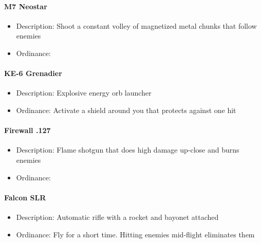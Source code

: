 \documentclass[../Main.tex]{subfiles}
\begin{document}
\paragraph{M7 Neostar}

\begin{itemize}
	\item Description: Shoot a constant volley of magnetized metal chunks that follow enemies
	\item Ordinance:
\end{itemize} 


\paragraph{KE-6 Grenadier}
 
\begin{itemize}
	\item Description: Explosive energy orb launcher
	\item Ordinance: Activate a shield around you that protects against one hit
\end{itemize} 

\paragraph{Firewall .127}

\begin{itemize}
	\item Description: Flame shotgun that does high damage up-close and burns enemies
	\item Ordinance: 
\end{itemize} 

\paragraph{Falcon SLR}

\begin{itemize}
	\item Description: Automatic rifle with a rocket and bayonet attached
	\item Ordinance: Fly for a short time. Hitting enemies mid-flight eliminates them
\end{itemize} 
\end{document}
